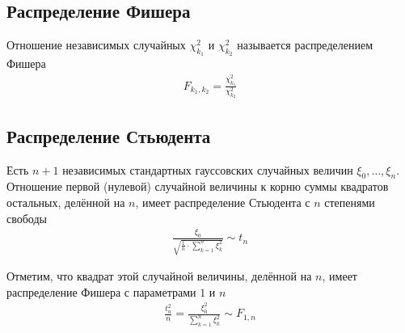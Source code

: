 \subsection{Распределение Фишера}
\begin{definition}
    Отношение независимых случайных $\chi_{k_1}^2$ и $\chi_{k_2}^2$ называется
    распределением Фишера
    \begin{align*}
        F_{k_1, k_2} = \frac{\chi_{k_1}^2}{\chi_{k_2}^2}
    \end{align*}
\end{definition}

\subsection{Распределение Стьюдента}
\begin{definition}
    Есть $n+1$ независимых стандартных гауссовских случайных величин
    $\xi_0, \dots, \xi_n$. Отношение первой (нулевой) случайной величины к корню
    суммы квадратов остальных, делённой на $n$, имеет распределение Стьюдента с
    $n$ степенями свободы
    \begin{align*}
        \frac{\xi_0}{\sqrt{\frac{1}{n} \cdot \sum_{k=1}^{n}\xi_k^2}} \sim t_n
    \end{align*}
\end{definition}

Отметим, что квадрат этой случайной величины, делённой на $n$, имеет
распределение Фишера с параметрами $1$ и $n$
\begin{align*}
    \frac{t_n^2}{n}
    = \frac{\xi_0^2}{\sum_{k=1}^{n}\xi_k^2}
    \sim F_{1, n}
\end{align*}


